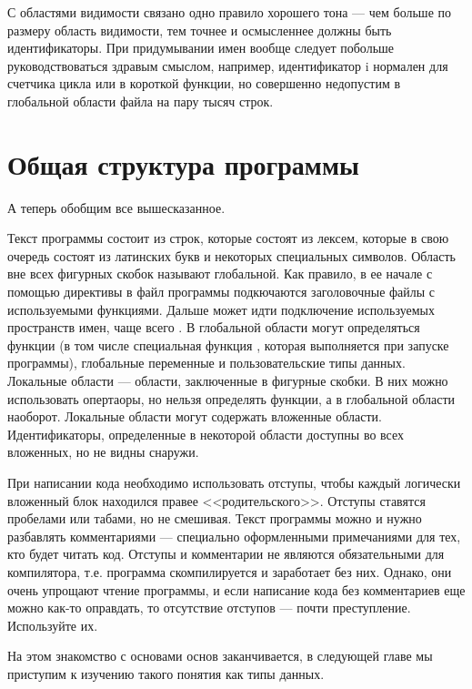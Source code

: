 \documentclass[book.tex]{subfiles}
\begin{document}

С областями видимости связано одно правило хорошего тона --- чем больше по размеру область видимости, тем точнее и осмысленнее должны быть идентификаторы. При придумывании имен вообще следует побольше руководствоваться здравым смыслом, например, идентификатор i нормален для счетчика цикла или в короткой функции, но совершенно недопустим в глобальной области файла на пару тысяч строк.

\section*{Общая структура программы}

А теперь обобщим все вышесказанное.

Текст программы состоит из строк, которые состоят из лексем, которые в свою очередь состоят из латинских букв и некоторых специальных символов. Область вне всех фигурных скобок называют глобальной. Как правило, в ее начале с помощью директивы  в файл программы подкючаются заголовочные файлы с используемыми функциями. Дальше может идти подключение используемых пространств имен, чаще всего . В глобальной области могут определяться функции (в том числе специальная функция , которая выполняется при запуске программы), глобальные переменные и пользовательские типы данных. Локальные области --- области, заключенные в фигурные скобки. В них можно использовать опертаоры, но нельзя определять функции, а в глобальной области наоборот. Локальные области могут содержать вложенные области. Идентификаторы, определенные в некоторой области доступны во всех вложенных, но не видны снаружи.

При написании кода необходимо использовать отступы, чтобы каждый логически вложенный блок находился правее <<родительского>>. Отступы ставятся пробелами или табами, но не смешивая. Текст программы можно и нужно разбавлять комментариями --- специально оформленными примечаниями для тех, кто будет читать код. Отступы и комментарии не являются обязательными для компилятора, т.е. программа скомпилируется и заработает без них. Однако, они очень упрощают чтение программы, и если написание кода без комментариев еще можно как-то оправдать, то отсутствие отступов --- почти преступление. Используйте их.

На этом знакомство с основами основ заканчивается, в следующей главе мы приступим к изучению такого понятия как типы данных.
\end{document}
